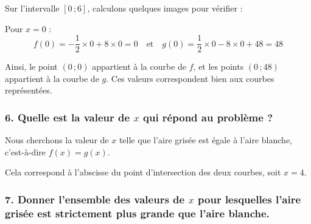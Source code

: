 \documentclass[a4paper,11pt]{article}
\begin{document}
Sur l'intervalle $[0\,;6]$, calculons quelques images pour vérifier :

\medskip

Pour $x = 0$ :
\[
f(0) = -\dfrac{1}{2} \times 0 + 8 \times 0 = 0 \quad \text{et} \quad g(0) = \dfrac{1}{2} \times 0 - 8 \times 0 + 48 = 48
\]


Ainsi, le point $(0\,;0)$ appartient à la courbe de $f$, et les points $(0\,;48)$ appartient à la courbe de $g$. Ces valeurs correspondent bien aux courbes représentées.


\bigskip

\subsubsection*{6. Quelle est la valeur de $x$ qui répond au problème ?}

Nous cherchons la valeur de $x$ telle que l’aire grisée est égale à l’aire blanche, c'est-à-dire $f(x) = g(x)$.

%
Cela correspond à l'abscisse du point d'intersection des deux courbes, soit $x = 4$.


\bigskip

\subsubsection*{7. Donner l’ensemble des valeurs de $x$ pour lesquelles l’aire grisée est strictement plus grande que l’aire blanche.}
\end{document}
